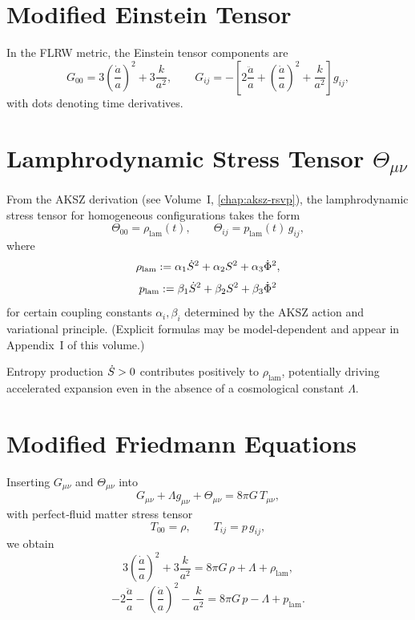 \section{Modified Einstein Tensor}

In the FLRW metric, the Einstein tensor components are
\[
  G_{00}
  = 3\left(\frac{\dot{a}}{a}\right)^2 + 3\frac{k}{a^2},
\qquad
  G_{ij}
  = -\left[
    2\frac{\ddot{a}}{a}
    + \left(\frac{\dot{a}}{a}\right)^2
    + \frac{k}{a^2}
  \right] g_{ij},
\]
with dots denoting time derivatives.

\section{Lamphrodynamic Stress Tensor $\Theta_{\mu\nu}$}
\label{sec:theta-flrw}

From the AKSZ derivation (see Volume~I, \cref{chap:aksz-rsvp}), the lamphrodynamic
stress tensor for homogeneous configurations takes the form
\[
  \Theta_{00}
  = \rho_{\mathrm{lam}}(t),
\qquad
  \Theta_{ij}
  = p_{\mathrm{lam}}(t)\,g_{ij},
\]
where
\begin{equation}
\label{eq:rho-lam}
  \rho_{\mathrm{lam}}
  := \alpha_1 \dot{S}^2 + \alpha_2 S^2 + \alpha_3\dot{\Phi}^2,
\end{equation}
\begin{equation}
\label{eq:p-lam}
  p_{\mathrm{lam}}
  := \beta_1 \dot{S}^2 + \beta_2 S^2 + \beta_3\dot{\Phi}^2
\end{equation}
for certain coupling constants $\alpha_i,\beta_i$ determined by the AKSZ
action and variational principle. (Explicit formulas may be model‐dependent
and appear in Appendix~I of this volume.)

\begin{remark}
Entropy production $\dot{S}>0$ contributes positively to
$\rho_{\mathrm{lam}}$, potentially driving accelerated expansion even in the
absence of a cosmological constant $\Lambda$.
\end{remark}

\section{Modified Friedmann Equations}

Inserting $G_{\mu\nu}$ and $\Theta_{\mu\nu}$ into
\[
  G_{\mu\nu} + \Lambda g_{\mu\nu} + \Theta_{\mu\nu}
  = 8\pi G\,T_{\mu\nu},
\]
with perfect‐fluid matter stress tensor
\[
  T_{00} = \rho, \qquad T_{ij} = p\,g_{ij},
\]
we obtain
\begin{equation}
\label{eq:friedmann1-rsvp}
  3\left(\frac{\dot{a}}{a}\right)^2
  + 3\frac{k}{a^2}
  = 8\pi G\,\rho
  + \Lambda
  + \rho_{\mathrm{lam}},
\end{equation}
\begin{equation}
\label{eq:friedmann2-rsvp}
  -2\frac{\ddot{a}}{a}
  - \left(\frac{\dot{a}}{a}\right)^2
  - \frac{k}{a^2}
  = 8\pi G\,p
  - \Lambda
  + p_{\mathrm{lam}}.
\end{equation}

